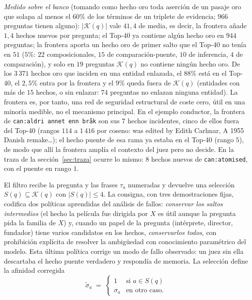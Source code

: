\documentclass[11pt,a4paper]{article}
\begin{document}
\emph{Medido sobre el banco} (tomando como hecho oro toda aserción de un
pasaje oro que solapa al menos el $60\%$ de los términos de un triplete
de evidencia; $966$ preguntas tienen alguno): $|\mathcal{K}(q)|$ vale
$41{,}4$ de media, es decir, la frontera añade $1{,}4$ hechos nuevos por
pregunta; el Top-40 ya contiene algún hecho oro en $944$ preguntas; la
frontera aporta un hecho oro de primer salto que el Top-40 no tenía en
$51$ ($5\%$: $22$ composicionales, $15$ de comparación-puente, $10$ de
inferencia, $4$ de comparación), y solo en $19$ preguntas $\mathcal{K}(q)$
no contiene ningún hecho oro. De los $3\,371$ hechos oro que inciden en
una entidad enlazada, el $88\%$ está en el Top-40, el $2{,}5\%$ entra por
la frontera y el $9\%$ queda fuera de $\mathcal{K}(q)$ (entidades con más
de $15$ hechos, o sin enlazar: $74$ preguntas no enlazan ninguna
entidad). La frontera es, por tanto, una red de seguridad estructural
de coste cero, útil en una minoría medible, no el mecanismo principal.
En el ejemplo conductor, la frontera de \texttt{can:aldri annet enn
bråk} son sus $7$ hechos incidentes, cinco de ellos fuera del Top-40
(rangos $114$ a $1\,416$ por coseno: \guillemotleft{}was edited by Edith
Carlmar\guillemotright{}, \guillemotleft{}A 1955 Danish remake\dots\guillemotright{}); el hecho puente de esa
rama ya estaba en el Top-40 (rango $5$), de modo que allí la frontera
amplía el contexto del juez pero no decide. En la traza de la
sección~\ref{sec:traza} ocurre lo mismo: $8$ hechos nuevos de
\texttt{can:atomised}, con el puente en rango $1$.

El filtro recibe la pregunta y las frases $\tau_a$ numeradas y devuelve una
selección $S(q) \subseteq \mathcal{K}(q)$ con $|S(q)| \le 4$. La consigna,
con tres demostraciones fijas, codifica dos políticas aprendidas del
análisis de fallos: \emph{conservar los saltos intermedios} (el hecho \guillemotleft{}la
película fue dirigida por $X$\guillemotright{} es útil aunque la pregunta pida la familia de
$X$) y, cuando un papel de la pregunta (intérprete, director, fundador)
tiene varios candidatos en los hechos, \emph{conservarlos todos}, con
prohibición explícita de resolver la ambigüedad con conocimiento paramétrico
del modelo. Esta última política corrige un modo de fallo observado: un juez
sin ella descartaba el hecho puente verdadero y \guillemotleft{}respondía de memoria\guillemotright{}. La
selección define la afinidad corregida
\begin{equation}
\tilde{\sigma}_a \;=\;
\begin{cases}
1 & \text{si } a \in S(q)\\
\sigma_a & \text{en otro caso.}
\end{cases}
\label{eq:sigma-tilde}
\end{equation}
\end{document}
